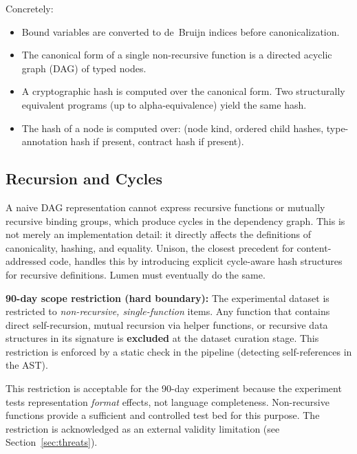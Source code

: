 \documentclass[11pt]{article}
\begin{document}
Concretely:
\begin{itemize}
  \item Bound variables are converted to de~Bruijn indices before
        canonicalization.
  \item The canonical form of a single non-recursive function is a
        directed acyclic graph (DAG) of typed nodes.
  \item A cryptographic hash is computed over the canonical form.  Two
        structurally equivalent programs (up to alpha-equivalence)
        yield the same hash.
  \item The hash of a node is computed over: (node kind, ordered child
        hashes, type-annotation hash if present, contract hash if
        present).
\end{itemize}

\subsection*{Recursion and Cycles}

A naive DAG representation cannot express recursive functions or
mutually recursive binding groups, which produce cycles in the
dependency graph.  This is not merely an implementation detail: it
directly affects the definitions of canonicality, hashing, and
equality.  Unison, the closest precedent for content-addressed code,
handles this by introducing explicit cycle-aware hash structures for
recursive definitions.  Lumen must eventually do the same.

\textbf{90-day scope restriction (hard boundary):}  The experimental
dataset is restricted to \emph{non-recursive, single-function} items.
Any function that contains direct self-recursion, mutual recursion via
helper functions, or recursive data structures in its signature is
\textbf{excluded} at the dataset curation stage.  This restriction is
enforced by a static check in the pipeline (detecting self-references
in the AST).

This restriction is acceptable for the 90-day experiment because the
experiment tests representation \emph{format} effects, not language
completeness.  Non-recursive functions provide a sufficient and
controlled test bed for this purpose.  The restriction is acknowledged
as an external validity limitation (see Section~\ref{sec:threats}).
\end{document}
